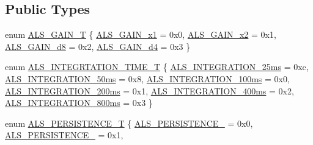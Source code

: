 \subsection*{Public Types}
\begin{DoxyCompactItemize}
\item 
enum \hyperlink{classVEML7700_a7328cc2563da545e48ea72381dc7bd9b}{A\+L\+S\+\_\+\+G\+A\+I\+N\+\_\+T} \{ \hyperlink{classVEML7700_a7328cc2563da545e48ea72381dc7bd9ba4c07a5980fa8aa1e6ea3e6e85a26eddf}{A\+L\+S\+\_\+\+G\+A\+I\+N\+\_\+x1} = 0x0, 
\hyperlink{classVEML7700_a7328cc2563da545e48ea72381dc7bd9ba80722e7850af774e558b2ef7684a81f4}{A\+L\+S\+\_\+\+G\+A\+I\+N\+\_\+x2} = 0x1, 
\hyperlink{classVEML7700_a7328cc2563da545e48ea72381dc7bd9ba393b9df437329457ca21bff810c8b7ee}{A\+L\+S\+\_\+\+G\+A\+I\+N\+\_\+d8} = 0x2, 
\hyperlink{classVEML7700_a7328cc2563da545e48ea72381dc7bd9ba0b5e6555c821a9c50adbe60629b15e4b}{A\+L\+S\+\_\+\+G\+A\+I\+N\+\_\+d4} = 0x3
 \}
\item 
enum \hyperlink{classVEML7700_a82e8b8f9960d8f80bc31dcfe7133ad6e}{A\+L\+S\+\_\+\+I\+N\+T\+E\+G\+R\+T\+A\+T\+I\+O\+N\+\_\+\+T\+I\+M\+E\+\_\+T} \{ \newline
\hyperlink{classVEML7700_a82e8b8f9960d8f80bc31dcfe7133ad6eac645a7593dba12a6d9410de0d7bd1703}{A\+L\+S\+\_\+\+I\+N\+T\+E\+G\+R\+A\+T\+I\+O\+N\+\_\+25ms} = 0xc, 
\hyperlink{classVEML7700_a82e8b8f9960d8f80bc31dcfe7133ad6eac1519635aa44f50fcc4ed955ad1c04e1}{A\+L\+S\+\_\+\+I\+N\+T\+E\+G\+R\+A\+T\+I\+O\+N\+\_\+50ms} = 0x8, 
\hyperlink{classVEML7700_a82e8b8f9960d8f80bc31dcfe7133ad6ea400cae3f071cb84b9eb779dae45e2f37}{A\+L\+S\+\_\+\+I\+N\+T\+E\+G\+R\+A\+T\+I\+O\+N\+\_\+100ms} = 0x0, 
\hyperlink{classVEML7700_a82e8b8f9960d8f80bc31dcfe7133ad6ea4907ac5a1fae354c96383c7f1a8b7aac}{A\+L\+S\+\_\+\+I\+N\+T\+E\+G\+R\+A\+T\+I\+O\+N\+\_\+200ms} = 0x1, 
\newline
\hyperlink{classVEML7700_a82e8b8f9960d8f80bc31dcfe7133ad6ea0d6e0a5191550c7983a5e6d3e4376495}{A\+L\+S\+\_\+\+I\+N\+T\+E\+G\+R\+A\+T\+I\+O\+N\+\_\+400ms} = 0x2, 
\hyperlink{classVEML7700_a82e8b8f9960d8f80bc31dcfe7133ad6eab6d8894bd9f6a20f4a9870751e572fda}{A\+L\+S\+\_\+\+I\+N\+T\+E\+G\+R\+A\+T\+I\+O\+N\+\_\+800ms} = 0x3
 \}
\item 
enum \hyperlink{classVEML7700_a4f3d9c3d3014149a380dabbf35decb3c}{A\+L\+S\+\_\+\+P\+E\+R\+S\+I\+S\+T\+E\+N\+C\+E\+\_\+T} \{ \hyperlink{classVEML7700_a4f3d9c3d3014149a380dabbf35decb3cace3cd89e100b478d3cce4c053e8d23e1}{A\+L\+S\+\_\+\+P\+E\+R\+S\+I\+S\+T\+E\+N\+C\+E\+\_} = 0x0, 
\hyperlink{classVEML7700_a4f3d9c3d3014149a380dabbf35decb3ca7277f3289328bb4c176243aec5f6015b}{A\+L\+S\+\_\+\+P\+E\+R\+S\+I\+S\+T\+E\+N\+C\+E\+\_} = 0x1, 

\end{DoxyCompactItemize}
